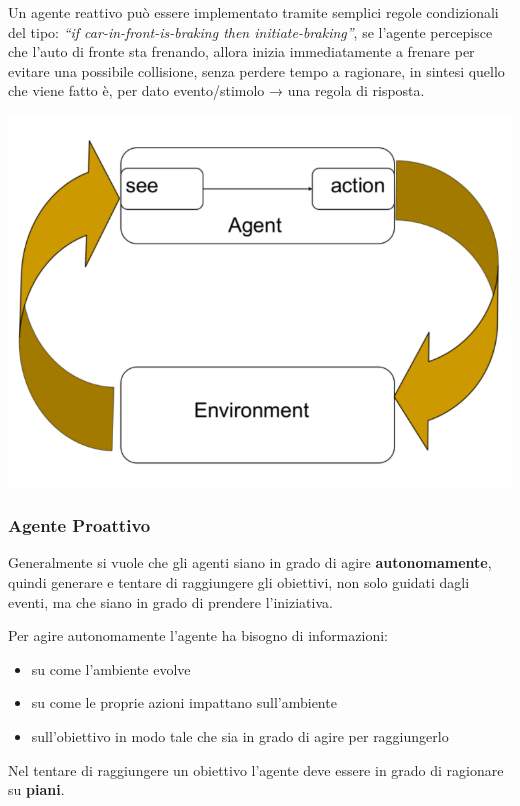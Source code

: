 Un agente reattivo può essere implementato tramite semplici regole condizionali del tipo: \textit{“if car-in-front-is-braking then initiate-braking”}, se l’agente percepisce che l’auto di fronte sta frenando, allora inizia immediatamente a frenare per evitare una possibile collisione, senza perdere tempo a ragionare, in sintesi quello che viene fatto è, per dato evento/stimolo → una regola di risposta.
\begin{center}
    \includegraphics[scale=0.4]{images/agente reattivo.PNG}
\end{center}

\subsubsection{Agente Proattivo}
Generalmente si vuole che gli agenti siano in grado di agire \textbf{autonomamente}, quindi generare e tentare di raggiungere gli obiettivi, non solo guidati dagli eventi, ma che siano in grado di prendere l’iniziativa.

Per agire autonomamente l'agente ha bisogno di informazioni:
\begin{itemize}
    \item su come l’ambiente evolve
    \item su come le proprie azioni impattano sull’ambiente
    \item sull'obiettivo in modo tale che sia in grado di agire per raggiungerlo
\end{itemize}

Nel tentare di raggiungere un obiettivo l’agente deve essere in grado di ragionare su \textbf{piani}.

